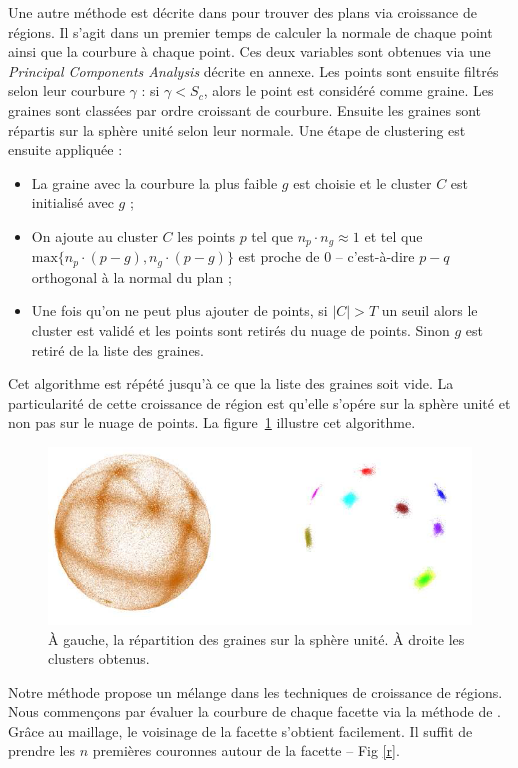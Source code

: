 \documentclass[12pt, twoside]{article}
\begin{document}
Une autre méthode est décrite dans \cite{reggrow3} pour trouver des plans via croissance de régions. Il s'agit dans un premier temps de calculer la normale de chaque point ainsi que la courbure à chaque point. Ces deux variables sont obtenues via une \textit{Principal Components Analysis} décrite en annexe. Les points sont ensuite filtrés selon leur courbure $\gamma$ : si $\gamma < S_c$, alors le point est considéré comme graine. Les graines sont classées par ordre croissant de courbure. Ensuite les graines sont répartis sur la sphère unité selon leur normale. Une étape de clustering est ensuite appliquée :
\begin{itemize}
  \item La graine avec la courbure la plus faible $g$ est choisie et le cluster $C$ est initialisé avec $g$ ;
  \item On ajoute au cluster $C$ les points $p$ tel que $n_p\cdot n_g \approx 1$ et tel que $\text{max}\{n_p\cdot(p-g), n_g\cdot(p-g)\}$ est proche de 0 -- c'est-à-dire $p-q$ orthogonal à la normal du plan ;
  \item Une fois qu'on ne peut plus ajouter de points, si $\vert C\vert > T$ un seuil alors le cluster est validé et les points sont retirés du nuage de points. Sinon $g$ est retiré de la liste des graines.
\end{itemize}
Cet algorithme est répété jusqu'à ce que la liste des graines soit vide. La particularité de cette croissance de région est qu'elle s'opére sur la sphère unité et non pas sur le nuage de points. La figure~\ref{fig:GaussMap} illustre cet algorithme.

\begin{figure}[h]
\centering
\includegraphics[scale=0.65]{GaussMap.png}
\caption{\label{fig:GaussMap} À gauche, la répartition des graines sur la sphère unité. À droite les clusters obtenus.}
\end{figure}

Notre méthode propose un mélange dans les techniques de croissance de régions. Nous commençons par évaluer la courbure de chaque facette via la méthode de \cite{reggrow3}. Grâce au maillage, le voisinage de la facette s'obtient facilement. Il suffit de prendre les $n$ premières couronnes autour de la facette -- Fig \ref{r}.
\end{document}
